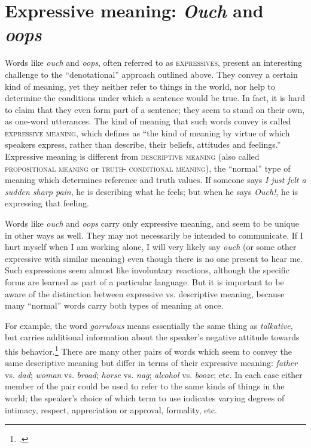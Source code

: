 \section{Expressive meaning: \textit{Ouch} and \textit{oops}}\label{sec:2.6}

Words like \textit{ouch} and \textit{oops}, often referred to as \textsc{expressives}, present an interesting challenge to the “denotational” approach outlined above. They convey a certain kind of meaning, yet they neither refer to things in the world, nor help to determine the conditions under which a sentence would be true. In fact, it is hard to claim that they even form part of a sentence; they seem to stand on their own, as one-word utterances. The kind of meaning that such words convey is called \textsc{expressive meaning}, which \citet[44]{Lyons1995} defines as “the kind of meaning by virtue of which speakers express, rather than describe, their beliefs, attitudes and feelings.” Expressive meaning is different from \textsc{descriptive meaning} (also called \textsc{propositional meaning} or \textsc{truth-} \textsc{conditional} \textsc{meaning}), the “normal” type of meaning which determines reference and truth values. If someone says \textit{I just felt a sudden sharp pain}, he is describing what he feels; but when he says \textit{Ouch!}, he is expressing that feeling.



Words like \textit{ouch} and \textit{oops} carry only expressive meaning, and seem to be unique in other ways as well. They may not necessarily be intended to communicate. If I hurt myself when I am working alone, I will very likely say \textit{ouch} (or some other expressive with similar meaning) even though there is no one present to hear me. Such expressions seem almost like involuntary reactions, although the specific forms are learned as part of a particular language. But it is important to be aware of the distinction between expressive vs. descriptive meaning, because many “normal” words carry both types of meaning at once.



For example, the word \textit{garrulous} means essentially the same thing as \textit{talkative}, but carries additional information about the speaker’s negative attitude towards this behavior.\footnote{\citet{Barker2002}.} There are many other pairs of words which seem to convey the same descriptive meaning but differ in terms of their expressive meaning: \textit{father} vs. \textit{dad}; \textit{woman} vs. \textit{broad}; \textit{horse} vs. \textit{nag}; \textit{alcohol} vs. \textit{booze}; etc. In each case either member of the pair could be used to refer to the same kinds of things in the world; the speaker’s choice of which term to use indicates varying degrees of intimacy, respect, appreciation or approval, formality, etc.



